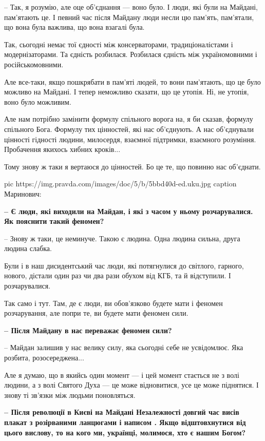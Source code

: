 – Так, я розумію, але оце об’єднання --- воно було. І люди, які були на Майдані,
пам’ятають це. І певний час після Майдану люди несли цю пам'ять, пам’ятали, що
вона була важлива, що вона взагалі була. 

Так, сьогодні немає тої єдності між консерваторами, традиціоналістами і
модернізаторами. Та єдність розбилася. Розбилася єдність між україномовними і
російськомовними. 

Але все-таки, якщо пошкрябати в пам'яті людей, то вони пам’ятають, що це було
можливо на Майдані. І тепер неможливо сказати, що це утопія. Ні, не утопія,
воно було можливим.

Але нам потрібно замінити формулу спільного ворога на, я би сказав, формулу
спільного Бога. Формулу тих цінностей, які нас об’єднують. А нас об’єднували
цінності гідності людини, милосердя, взаємної підтримки, взаємного розуміння.
Пробачення якихось хибних кроків...

Тому знову ж таки я вертаюся до цінностей. Бо це те, що повинно нас об’єднати.

\ifcmt
pic https://img.pravda.com/images/doc/5/b/5bbd40d-ed.uku.jpg 
caption Маринович: 
\fi

{\bfseries 
– Є люди, які виходили на Майдан, і які з часом у ньому розчарувалися. Як пояснити такий феномен?
}

– Знову ж таки, це неминуче. Такою є людина. Одна людина сильна, друга людина слабка. 

Були і в наш дисидентський час люди, які потягнулися до світлого, гарного, нового, дістали один раз чи два рази обухом від КГБ, та й відступили. І розчарувалися. 

Так само і тут. Там, де є люди, ви обов’язково будете мати і феномен розчарування, але попри те, ви будете мати феномен сили.

{\bfseries 
– Після Майдану в нас переважає феномен сили?
}

– Майдан залишив у нас велику силу, яка сьогодні себе не усвідомлює. Яка розбита, розосереджена... 

Але я думаю, що в якийсь один момент --- і цей момент стається не з волі людини,
а з волі Святого Духа --- це може відновитися, усе це може піднятися. І знову ті
зв’язки між людьми поновляться.

\textbf{– Після революції в Києві на Майдані Незалежності довгий час висів плакат з
розірваними ланцюгами і написом . Якщо
відштовхнутися від цього вислову, то на кого ми, українці, молимося, хто є
нашим Богом?}

